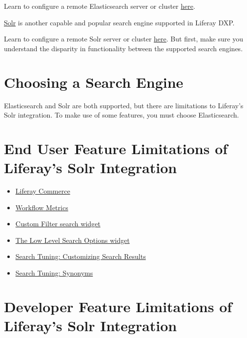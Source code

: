 Learn to configure a remote Elasticsearch server or cluster
\href{/docs/7-2/deploy/-/knowledge_base/d/installing-elasticsearch}{here}.

\href{http://lucene.apache.org/solr}{Solr} is another capable and
popular search engine supported in Liferay DXP.

Learn to configure a remote Solr server or cluster
\href{/docs/7-2/deploy/-/knowledge_base/d/installing-solr}{here}. But
first, make sure you understand the disparity in functionality between
the supported search engines.

\section{Choosing a Search Engine}\label{choosing-a-search-engine}

Elasticsearch and Solr are both supported, but there are limitations to
Liferay's Solr integration. To make use of some features, you must
choose Elasticsearch.

\section{End User Feature Limitations of Liferay's Solr
Integration}\label{end-user-feature-limitations-of-liferays-solr-integration}

\begin{itemize}
\tightlist
\item
  \href{https://learn.liferay.com/commerce-2.x/index.html}{Liferay
  Commerce}
\item
  \href{https://help.liferay.com/hc/en-us/articles/360029042071-Workflow-Metrics-The-Service-Level-Agreement-SLA-}{Workflow
  Metrics}
\item
  \href{/docs/7-2/user/-/knowledge_base/u/filtering-search-results-with-the-custom-filter-widget}{Custom
  Filter search widget}
\item
  \href{/docs/7-2/user/-/knowledge_base/u/low-level-search-options-searching-additional-or-alternate-indexes}{The
  Low Level Search Options widget}
\item
  \href{https://help.liferay.com/hc/en-us/articles/360034473872-Search-Tuning-Customizing-Search-Results}{Search
  Tuning: Customizing Search Results}
\item
  \href{https://help.liferay.com/hc/en-us/articles/360034473852-Search-Tuning-Synonym-Sets}{Search
  Tuning: Synonyms}
\end{itemize}

\section{Developer Feature Limitations of Liferay's Solr
Integration}\label{developer-feature-limitations-of-liferays-solr-integration}

